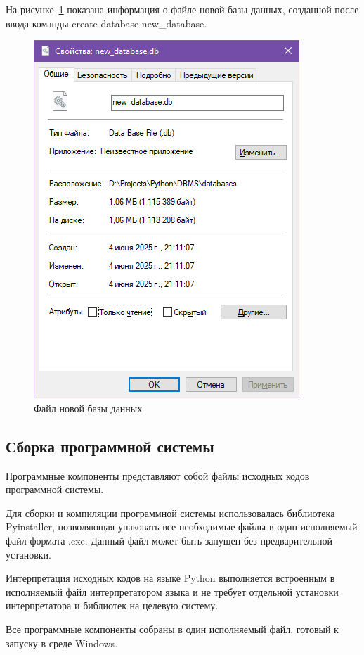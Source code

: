 На рисунке~\ref{fig:new_db} показана информация о файле новой базы данных, созданной после ввода команды create database new\_database.
\begin{figure}[H]
	\centering
	\includegraphics[width=0.7\linewidth]{"images/новая бд"}
	\caption{Файл новой базы данных}
	\label{fig:new_db}
\end{figure}

\subsection{Сборка программной системы}

Программные компоненты представляют собой файлы исходных кодов программной системы.

Для сборки и компиляции программной системы использовалась библиотека Pyinstaller, позволяющая упаковать все необходимые файлы в один исполняемый файл формата .exe. Данный файл может быть запущен без предварительной установки.

Интерпретация исходных кодов на языке Python выполняется встроенным в исполняемый файл интерпретатором языка и не требует отдельной установки интерпретатора и библиотек на целевую систему.

Все программные компоненты собраны в один исполняемый файл, готовый к запуску в среде Windows.